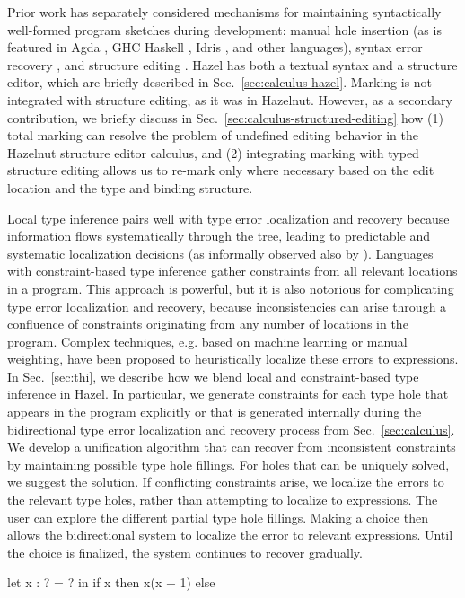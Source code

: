 Prior work has separately considered mechanisms for maintaining syntactically well-formed program sketches during development: manual hole insertion (as is featured in Agda \cite{agda}, GHC Haskell \cite{haskell-holes}, Idris \cite{idris-holes}, and other languages), syntax error recovery \cite{error-reovery}, and structure editing \cite{HazelnutPOPL}. 
Hazel has both a textual syntax and a structure editor, which are briefly described in Sec.~\ref{sec:calculus-hazel}. 
Marking is not integrated with structure editing, as it was in Hazelnut. 
However, as a secondary contribution, 
we briefly discuss in Sec.~\ref{sec:calculus-structured-editing} how (1)  total marking can resolve the problem of undefined editing behavior in the Hazelnut structure editor calculus, 
and (2) integrating marking with typed structure editing allows us to re-mark only where necessary based on the edit location and the type and binding structure.

Local type inference pairs well with type error localization and recovery because information flows systematically through the tree, leading to predictable and systematic localization decisions (as informally observed also by \cite{pierce}). Languages with constraint-based type inference gather constraints from all relevant locations in a program. This approach is powerful, but it is also notorious for complicating type error localization and recovery, because inconsistencies can arise through a confluence of constraints originating from any number of locations in the program. 
Complex techniques, e.g. based on machine learning or manual weighting, have been proposed to heuristically localize these errors to expressions. 
In Sec.~\ref{sec:thi}, we describe how we blend local and constraint-based type inference in Hazel. In particular,  
we generate constraints for each type hole that appears in the program explicitly or that is  generated internally during the  bidirectional type error localization and recovery process from Sec.~\ref{sec:calculus}. 
We develop a unification algorithm that can recover from inconsistent constraints by maintaining possible type hole fillings. For holes that can be uniquely solved, we suggest the solution. 
If conflicting constraints arise, we localize the errors to the relevant type holes, rather 
than attempting to localize to expressions. 
The user can explore the different partial type hole fillings. Making a choice then allows the bidirectional system to localize the error to relevant expressions.
Until the choice is finalized, the system continues to recover gradually.




let x : ? = ? in 
if x then x(x + 1) else 

